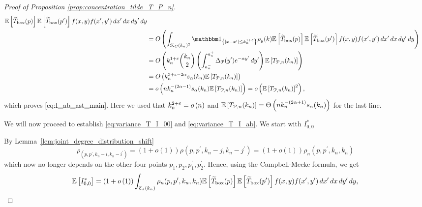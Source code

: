 \begin{proof}[Proof of Proposition \ref{prop:concentration_tilde_T_P_n}]
\begin{align*}
		\Exp{\widetilde{T}_{\text{box}}(p)}\Exp{\widetilde{T}_{\text{box}}(p^\prime)} f(x,y) f(x^\prime,y^\prime) \, dx^\prime \, dx \, dy^\prime \, dy\\
	&= \bigO{\int_{\Kcal_C(k_n)^2} \ind{|x-x^\prime| \le k_n^{1 + \varepsilon}} \rho_{y}(k) 
		\Exp{\widetilde{T}_{\text{box}}(p)}\Exp{\widetilde{T}_{\text{box}}(p^\prime)} f(x,y) f(x^\prime,y^\prime) \, dx^\prime \, dx \, dy^\prime \, dy}\\
	&= \bigO{k_n^{1+\varepsilon} \binom{k_n}{2} \left(\int_{a_n^-}^{a_n^+} \Delta_{\Pcal}(y^\prime) 
			e^{-\alpha y^\prime} \, dy^\prime\right) \Exp{T_{\Pcal,n}(k_n)}}\\
	&= \bigO{k_n^{3 + \varepsilon -2\alpha} s_\alpha(k_n) \Exp{T_{\Pcal,n}(k_n)}}\\
	&= \smallO{n k_n^{-(2\alpha - 1)}s_\alpha(k_n) \Exp{T_{\Pcal,n}(k_n)}} = \smallO{\Exp{T_{\Pcal,n}(k_n)}^2},
\end{align*}
which proves \eqref{eq:I_ab_ast_main}. Here we used that $k_n^{2 + \varepsilon} = o\left(n\right)$ and $\mathbb{E}\left[T_{{\mathcal P},n}(k_n)\right] = \Theta\left(n k_n^{-(2\alpha + 1)}s_\alpha(k_n)\right)$ for the last line.


We will now proceed to establish \eqref{eq:variance_T_I_00} and \eqref{eq:variance_T_I_ab}. We start with $I_{0,0}^\ast$ 


By Lemma~\ref{lem:joint_degree_distribution_shift} 
\[
	\rho_(p,p^\prime, k_n-i,k_n-i^\prime) = (1+o(1))\rho(p,p^\prime, k_n-j,k_n-j^\prime) 
	= (1+o(1))\rho_{n}(p, p^\prime, k_n, k_n)
\]
which now no longer depends on the other four points $p_1, p_2, p_1^\prime, p_2^\prime$. Hence, using the Campbell-Mecke formula, we get
\[
	\mathbb{E}\left[I_{0,0}^\ast\right] = (1 + o\left(1\right))\int_{\mathcal{E}_{\varepsilon}(k_n)}\rho_{n}(p,p^\prime,k_n, k_n)
		\mathbb{E}\left[\widetilde{T}_{\text{box}}(p)\right]\mathbb{E}\left[\widetilde{T}_{\text{box}}(p^\prime)\right] f(x,y)
		f(x^\prime,y^\prime) \, dx^\prime \, dx \, dy^\prime \, dy,
\]


\end{proof}
